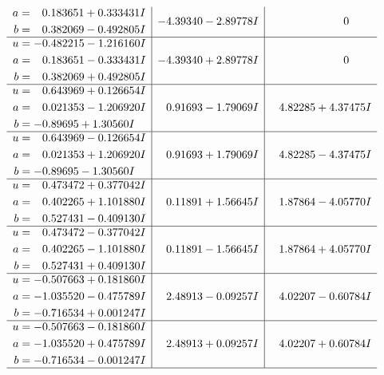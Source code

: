 \documentclass[1p]{elsarticle_modified}
\theoremstyle{definition}
\begin{document}
$$\begin{array}{c|c|c}
\begin{aligned}
a &= \phantom{-}0.183651 + 0.333431 I \\
b &= \phantom{-}0.382069 - 0.492805 I\end{aligned}
 & -4.39340 - 2.89778 I & \phantom{-0.000000 } 0 \\ \hline\begin{aligned}
u &= -0.482215 - 1.216160 I \\
a &= \phantom{-}0.183651 - 0.333431 I \\
b &= \phantom{-}0.382069 + 0.492805 I\end{aligned}
 & -4.39340 + 2.89778 I & \phantom{-0.000000 } 0 \\ \hline\begin{aligned}
u &= \phantom{-}0.643969 + 0.126654 I \\
a &= \phantom{-}0.021353 - 1.206920 I \\
b &= -0.89695 + 1.30560 I\end{aligned}
 & \phantom{-}0.91693 - 1.79069 I & \phantom{-}4.82285 + 4.37475 I \\ \hline\begin{aligned}
u &= \phantom{-}0.643969 - 0.126654 I \\
a &= \phantom{-}0.021353 + 1.206920 I \\
b &= -0.89695 - 1.30560 I\end{aligned}
 & \phantom{-}0.91693 + 1.79069 I & \phantom{-}4.82285 - 4.37475 I \\ \hline\begin{aligned}
u &= \phantom{-}0.473472 + 0.377042 I \\
a &= \phantom{-}0.402265 + 1.101880 I \\
b &= \phantom{-}0.527431 - 0.409130 I\end{aligned}
 & \phantom{-}0.11891 + 1.56645 I & \phantom{-}1.87864 - 4.05770 I \\ \hline\begin{aligned}
u &= \phantom{-}0.473472 - 0.377042 I \\
a &= \phantom{-}0.402265 - 1.101880 I \\
b &= \phantom{-}0.527431 + 0.409130 I\end{aligned}
 & \phantom{-}0.11891 - 1.56645 I & \phantom{-}1.87864 + 4.05770 I \\ \hline\begin{aligned}
u &= -0.507663 + 0.181860 I \\
a &= -1.035520 - 0.475789 I \\
b &= -0.716534 + 0.001247 I\end{aligned}
 & \phantom{-}2.48913 - 0.09257 I & \phantom{-}4.02207 - 0.60784 I \\ \hline\begin{aligned}
u &= -0.507663 - 0.181860 I \\
a &= -1.035520 + 0.475789 I \\
b &= -0.716534 - 0.001247 I\end{aligned}
 & \phantom{-}2.48913 + 0.09257 I & \phantom{-}4.02207 + 0.60784 I\\
 \hline 
 \end{array}$$\newpage\newpage\renewcommand{\arraystretch}{1}
\end{document}
